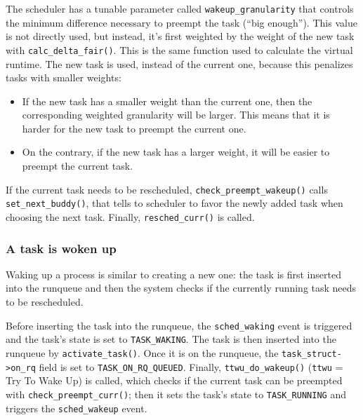The scheduler has a tunable parameter called \verb|wakeup_granularity| that controls the minimum difference necessary to preempt the task (``big enough''). This value is not directly used, but instead, it's first weighted by the weight of the new task with \verb|calc_delta_fair()|. This is the same function used to calculate the virtual runtime. The new task is used, instead of the current one, because this penalizes tasks with smaller weights:
\begin{itemize}
    \item If the new task has a smaller weight than the current one, then the corresponding weighted granularity will be larger. This means that it is harder for the new task to preempt the current one.
    
    \item On the contrary, if the new task has a larger weight, it will be easier to preempt the current task. 
\end{itemize}

If the current task needs to be rescheduled, \verb|check_preempt_wakeup()| calls \verb|set_next_buddy()|, that tells to scheduler to favor the newly added task when choosing the next task. Finally, \verb|resched_curr()| is called.

\subsubsection{A task is woken up}

Waking up a process is similar to creating a new one: the task is first inserted into the runqueue and then the system checks if the currently running task needs to be rescheduled.

Before inserting the task into the runqueue, the \verb|sched_waking|\label{trace:sched_waking} event is triggered and the task's state is set to \verb|TASK_WAKING|. The task is then inserted into the runqueue by \verb|activate_task()|. Once it is on the runqueue, the \verb|task_struct->on_rq| field  is set to \verb|TASK_ON_RQ_QUEUED|. Finally, \verb|ttwu_do_wakeup()| (\verb|ttwu| = Try To Wake Up) is called, which checks if the current task can be preempted with \verb|check_preempt_curr()|; then it sets the task's state to \verb|TASK_RUNNING| and triggers the \verb|sched_wakeup|\label{trace:sched_wakeup} event.

